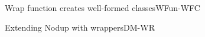 \documentclass[acmlarge, anonymous, authordraft, review]{acmart} %
\begin{document}
\begin{theorem}{Wrap function creates well-formed classes}{WFun-WFC}
%     
   \end{theorem}

\begin{lemma}{Extending Nodup with wrappers}{DM-WR}

  \begin{conds}
   \cond{\cload{\classoff\C\K}}
  \end{conds}
  
  \then\axiom{\cload{\classoff\D{\K~\k}}}

\end{lemma}
 
\end{document}
